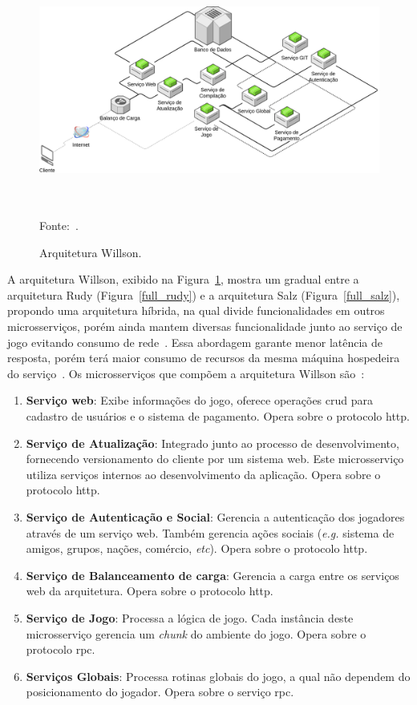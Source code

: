 \begin{figure}[htb!]
  \caption{Arquitetura Willson.}
  \label{full_willson}
  \includegraphics[height=7.5cm]{arquiteturas/full_willson.png}
  \centering

  Fonte:~\cite{stephenclarkewillson2017}.
\end{figure}


A arquitetura Willson, exibido na Figura~\ref{full_willson}, mostra um gradual entre a arquitetura Rudy (Figura~\ref{full_rudy}) e a arquitetura Salz (Figura~\ref{full_salz}), propondo uma arquitetura híbrida, na qual divide funcionalidades em outros microsserviços, porém ainda mantem diversas funcionalidade junto ao serviço de jogo evitando consumo de rede~\cite{albion_online_unite, willson}.
%
Essa abordagem garante menor latência de resposta, porém terá maior consumo de recursos da mesma máquina hospedeira do serviço~\cite{willson}.
%
Os microsserviços que compõem a arquitetura Willson são~\cite{willson, stephenclarkewillson2017}:

\begin{enumerate}
  \item \textbf{Serviço web}: Exibe informações do jogo, oferece operações \ac{crud} para cadastro de usuários e o sistema de pagamento. Opera sobre o protocolo \ac{http}.
  \item \textbf{Serviço de Atualização}: Integrado junto ao processo de desenvolvimento, fornecendo versionamento do cliente por um sistema web. Este microsserviço utiliza serviços internos ao desenvolvimento da aplicação. Opera sobre o protocolo \ac{http}.
  \item \textbf{Serviço de Autenticação e Social}: Gerencia a autenticação dos jogadores através de um serviço web. Também gerencia ações sociais (\textit{e.g.} sistema de amigos, grupos, nações, comércio, \textit{etc}). Opera sobre o protocolo \ac{http}.
  \item \textbf{Serviço de Balanceamento de carga}: Gerencia a carga entre os serviços web da arquitetura. Opera sobre o protocolo \ac{http}.
  \item \textbf{Serviço de Jogo}: Processa a lógica de jogo. Cada instância deste microsserviço gerencia um \textit{chunk} do ambiente do jogo. Opera sobre o protocolo \ac{rpc}.
  \item \textbf{Serviços Globais}: Processa rotinas globais do jogo, a qual não dependem do posicionamento do jogador. Opera sobre o serviço \ac{rpc}.
\end{enumerate}

